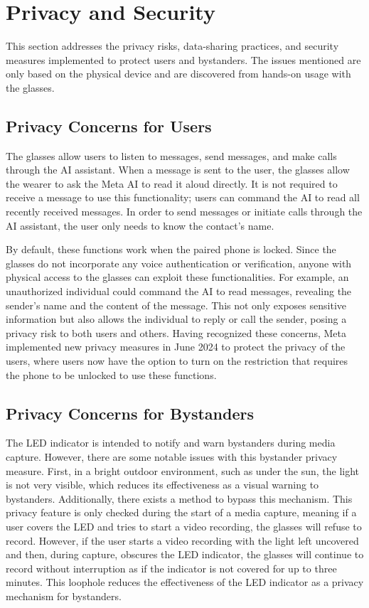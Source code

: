 \section{Privacy and Security}
This section addresses the privacy risks, data-sharing practices, and security measures implemented to protect users and bystanders. The issues mentioned are only based on the physical device and are discovered from hands-on usage with the glasses.


\subsection*{Privacy Concerns for Users}
The glasses allow users to listen to messages, send messages, and make calls through the AI assistant. When a message is sent to the user, the glasses allow the wearer to ask the Meta AI to read it aloud directly. It is not required to receive a message to use this functionality; users can command the AI to read all recently received messages. In order to send messages or initiate calls through the AI assistant, the user only needs to know the contact's name. 

By default, these functions work when the paired phone is locked. Since the glasses do not incorporate any voice authentication or verification, anyone with physical access to the glasses can exploit these functionalities. For example, an unauthorized individual could command the AI to read messages, revealing the sender's name and the content of the message. This not only exposes sensitive information but also allows the individual to reply or call the sender, posing a privacy risk to both users and others. Having recognized these concerns, Meta implemented new privacy measures in June 2024 to protect the privacy of the users, where users now have the option to turn on the restriction that requires the phone to be unlocked to use these functions. 

\subsection*{Privacy Concerns for Bystanders}
The LED indicator is intended to notify and warn bystanders during media capture. However, there are some notable issues with this bystander privacy measure. First, in a bright outdoor environment, such as under the sun, the light is not very visible, which reduces its effectiveness as a visual warning to bystanders. Additionally, there exists a method to bypass this mechanism. This privacy feature is only checked during the start of a media capture, meaning if a user covers the LED and tries to start a video recording, the glasses will refuse to record. However, if the user starts a video recording with the light left uncovered and then, during capture, obscures the LED indicator, the glasses will continue to record without interruption as if the indicator is not covered for up to three minutes. This loophole reduces the effectiveness of the LED indicator as a privacy mechanism for bystanders.

